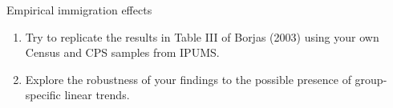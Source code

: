 Empirical immigration effects

\begin{enumerate}[label=(\alph*)]

\item 
Try to replicate the results in Table III of Borjas (2003) using your own Census and CPS samples from IPUMS.


\item
Explore the robustness of your findings to the possible presence of group-specific linear trends.


\end{enumerate}